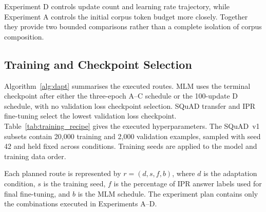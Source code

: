 \documentclass[pdflatex,sn-basic]{sn-jnl}
\begin{document}
Experiment D controls update count and learning rate trajectory, while
Experiment A controls the initial corpus token budget more closely. Together
they provide two bounded comparisons rather than a complete isolation of
corpus composition.

\subsection{Training and Checkpoint Selection}

Algorithm~\ref{alg:dapt} summarises the executed routes.
MLM uses the terminal checkpoint after either the three-epoch A--C schedule or
the 100-update D schedule, with no validation loss checkpoint selection. SQuAD
transfer and IPR fine-tuning
select the lowest validation loss checkpoint.
Table~\ref{tab:training_recipe} gives the executed hyperparameters.
The SQuAD~v1 subsets contain 20,000 training and 2,000 validation examples,
sampled with seed 42 and held fixed across conditions. Training seeds are
applied to the model and training data order.

Each planned route is represented by \(r=(d,s,f,b)\), where \(d\) is the
adaptation condition, \(s\) is the training seed, \(f\) is the percentage of
IPR answer labels used for final fine-tuning, and \(b\) is the MLM schedule.
The experiment plan contains only the combinations executed in Experiments
A--D.
\end{document}
